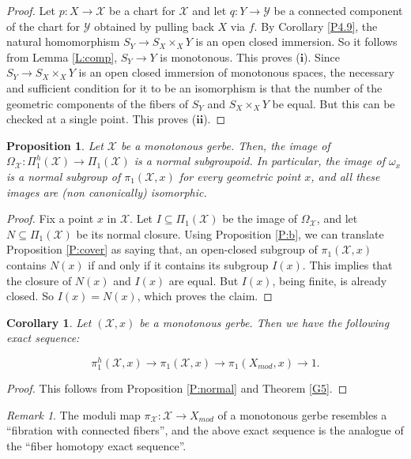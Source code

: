 \documentclass{amsart}
\newtheorem{cor}[thm]{Corollary}
\newtheorem{prop}[thm]{Proposition}
\theoremstyle{definition}
\theoremstyle{remark}
\newtheorem{rem}[thm]{Remark}
\theoremstyle{remark}
\newcommand{\X}{\mathcal{X}}
\newcommand{\Y}{\mathcal{Y}}
\newcommand{\Xm}{X_{mod}}
\newcommand{\ox}{\omega_x}
\newcommand{\OX}{\Omega_{\X}}
\newcommand{\x}{\times}
\newcommand{\PX}{\Pi_1(\X)}
\newcommand{\pX}{\pi_1(\X,x)}
\newcommand{\PhX}{\Pi_1^{h}(\X)}
\newcommand{\pXm}{\pi_1(\Xm,x)}
\let\:=\colon
\begin{document}
 \begin{proof}
 Let $p \: X \to \X$ be a chart for $\X$ and let $q  \: Y \to \Y$ be a connected component of
 the chart for $\Y$ obtained by pulling back
 $X$ via $f$. By Corollary \ref{P4.9}, the natural homomorphism $S_Y \to S_X \x_X Y$ is an open closed
 immersion. So it follows from Lemma \ref{L:comp}, $S_Y \to Y$ is monotonous. This proves ($\mathbf{i}$).
 Since $S_Y \to S_X \x_X Y$ is an open closed immersion of monotonous spaces, the necessary and
 sufficient condition for it to be an isomorphism is that the number of the geometric components of
 the fibers of $S_Y$ and $S_X \x_X Y$  be equal. But this can be checked at a single point.
 This proves ($\mathbf{ii}$).
 \end{proof}

 \begin{prop}{\label{P:normal}}
 Let $\X$ be a monotonous gerbe. Then, the image of $\OX \: \PhX \to \PX$ is a normal subgroupoid.
 In particular, the image of $\ox$ is a normal subgroup of $\pX$ for every
 geometric point $x$, and all these images are (non canonically) isomorphic.
 \end{prop}

 \begin{proof}
 Fix a point $x$ in $\X$. Let $I \subseteq \PX$ be the image of $\OX$, and let $N \subseteq \PX$ be its
 normal closure. Using Proposition \ref{P:b}, we can translate Proposition \ref{P:cover} as saying that,
 an open-closed subgroup of $\pX$ contains $N(x)$ if and only if it contains its subgroup $I(x)$.
 This implies that the closure of $N(x)$ and $I(x)$ are equal. But $I(x)$, being finite, is already closed.
 So $I(x)=N(x)$, which proves the claim.
 \end{proof}

\begin{cor}{\label{C:seq}}
Let $(\X,x)$ be a monotonous gerbe. Then we have the following
exact sequence:

$$\pi_1^{h}(\X,x) \to \pX \to \pXm \to 1.  $$

\end{cor}

\begin{proof}
This follows from Proposition \ref{P:normal} and  Theorem
\ref{G5}.
\end{proof}

\begin{rem}
The moduli map $\pi_{\X} \: \X \to \Xm$ of a monotonous gerbe
resembles a ``fibration with connected fibers'', and the above
exact sequence is the analogue of the ``fiber homotopy exact
sequence''.
\end{rem}
\end{document}
